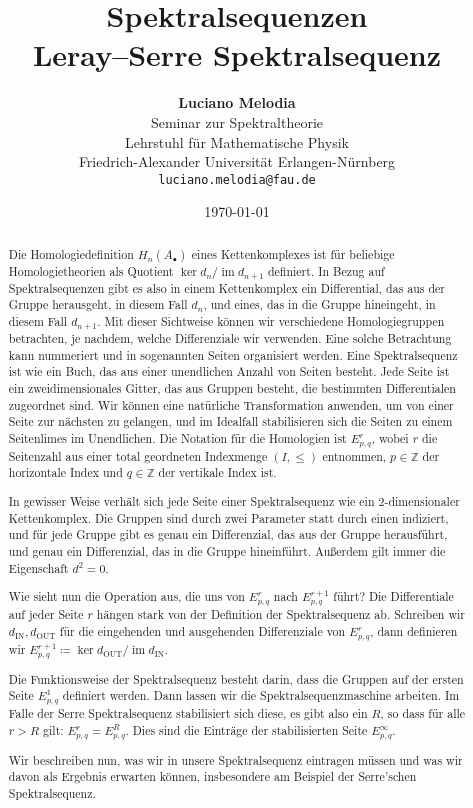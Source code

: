 \documentclass[12pt, hidelinks]{article}
\title{\textbf{Spektralsequenzen\\ Leray–Serre Spektralsequenz}}
\author{
\textbf{Luciano Melodia} \\
Seminar zur Spektraltheorie \\
Lehrstuhl für Mathematische Physik \\
Friedrich-Alexander Universität Erlangen-Nürnberg \\
\texttt{luciano.melodia@fau.de}}
\date{\today}
\numberwithin{conj}{section}
\newcommand{\ima}{\operatorname{im}}
\begin{document}
\hypersetup{bookmarksnumbered=true,}
\maketitle

\begin{abstract}
    Die Homologiedefinition $H_n(A_\bullet)$ eines Kettenkomplexes ist für beliebige Homologietheorien als Quotient $\ker d_n/\ima d_{n+1}$ definiert. In Bezug auf Spektralsequenzen gibt es also in einem Kettenkomplex ein Differential, das aus der Gruppe herausgeht, in diesem Fall $d_n$, und eines, das in die Gruppe hineingeht, in diesem Fall $d_{n+1}$. Mit dieser Sichtweise können wir verschiedene Homologiegruppen betrachten, je nachdem, welche Differenziale wir verwenden. Eine solche Betrachtung kann nummeriert und in sogenannten Seiten organisiert werden. Eine Spektralsequenz ist wie ein Buch, das aus einer unendlichen Anzahl von Seiten besteht. Jede Seite ist ein zweidimensionales Gitter, das aus Gruppen besteht, die bestimmten Differentialen zugeordnet sind. Wir können eine natürliche Transformation anwenden, um von einer Seite zur nächsten zu gelangen, und im Idealfall stabilisieren sich die Seiten zu einem Seitenlimes im Unendlichen. Die Notation für die Homologien ist $E^r_{p,q}$, wobei $r$ die Seitenzahl aus einer total geordneten Indexmenge $(I,\leq)$ entnommen, $p \in \mathbb{Z}$ der horizontale Index und $q \in \mathbb{Z}$ der vertikale Index ist.
    
    In gewisser Weise verhält sich jede Seite einer Spektralsequenz wie ein $2$-dimensionaler Kettenkomplex. Die Gruppen sind durch zwei Parameter statt durch einen indiziert, und für jede Gruppe gibt es genau ein Differenzial, das aus der Gruppe herausführt, und genau ein Differenzial, das in die Gruppe hineinführt. Außerdem gilt immer die Eigenschaft $d^2 = 0$.
    
    Wie sieht nun die Operation aus, die uns von $E^r_{p,q}$ nach $E^{r+1}_{p,q}$ führt? Die Differentiale auf jeder Seite $r$ hängen stark von der Definition der Spektralsequenz ab. Schreiben wir $d_{\operatorname{IN}},d_{\operatorname{OUT}}$ für die eingehenden und ausgehenden Differenziale von $E^r_{p,q}$, dann definieren wir $E^{r+1}_{p,q} \coloneq \ker d_{\operatorname{OUT}} / \ima d_{\operatorname{IN}}$.
    
    Die Funktionsweise der Spektralsequenz besteht darin, dass die Gruppen auf der ersten Seite $E^1_{p,q}$ definiert werden. Dann lassen wir die Spektralsequenzmaschine arbeiten. Im Falle der Serre Spektralsequenz stabilisiert sich diese, es gibt also ein $R$, so dass für alle $r > R$ gilt: $E^r_{p,q} = E^R_{p,q}$. Dies sind die Einträge der stabilisierten Seite $E^\infty_{p,q}$.
    
    Wir beschreiben nun, was wir in unsere Spektralsequenz eintragen müssen und was wir davon als Ergebnis erwarten können, insbesondere am Beispiel der Serre'schen Spektralsequenz.
\end{abstract}
\end{document}
